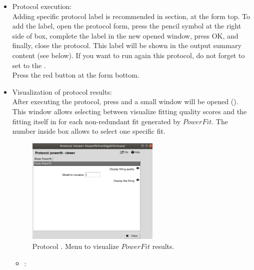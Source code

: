 \begin{itemize}
  \item Protocol execution:\\
  
  Adding specific protocol label is recommended in  section, at the form top. To add the label, open the protocol form, press the pencil symbol at the right side of  box, complete the label in the new opened window, press OK, and finally, close the protocol. This label will be shown in the output summary content (see below). If you want to run again this protocol, do not forget to set to  the .\\
  Press the  red button at the form bottom.\\
  
  \item Visualization of protocol results:\\
  
  After executing the protocol, press  and a small window will be opened (). This window allows selecting between visualize fitting quality scores and the fitting itself in \chimera for each non-redundant fit generated by $PowerFit$. The number inside  box allows to select one specific fit.\\
  
  \begin{figure}[H]
    \centering 
    \captionsetup{width=.7\linewidth} 
    \includegraphics[width=0.60\textwidth]{Images_appendix/Fig114.pdf}
    \caption{Protocol . Menu to visualize $PowerFit$ results.}
    \label{fig:app_protocol_powerfit_2}
   \end{figure}
   
   \begin{itemize}
   
    \item {}:\\
    

\end{itemize}
\end{itemize}
